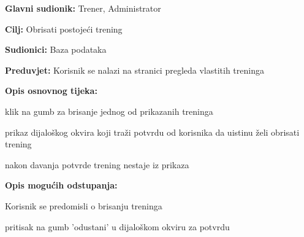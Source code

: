 					\noindent {}
					\begin{packed_item}
	
						\item \textbf{Glavni sudionik: }Trener, Administrator
						\item  \textbf{Cilj: } Obrisati postojeći trening
						\item  \textbf{Sudionici: } Baza podataka
						\item  \textbf{Preduvjet: } Korisnik se nalazi na stranici pregleda vlastitih treninga
						\item  \textbf{Opis osnovnog tijeka:}
						
						\item[] \begin{packed_enum}
	
							\item klik na gumb za brisanje jednog od prikazanih treninga
							\item prikaz dijaloškog okvira koji traži potvrdu od korisnika da uistinu želi obrisati trening
							\item nakon davanja potvrde trening nestaje iz prikaza
							
						\end{packed_enum}
						
						\item  \textbf{Opis mogućih odstupanja:}
						
						\item[] \begin{packed_item}
	
							\item[3.a] Korisnik se predomisli o brisanju treninga
							\item[] \begin{packed_enum}
								
								\item pritisak na gumb 'odustani' u dijaloškom okviru za potvrdu
								
							\end{packed_enum}
							
						\end{packed_item}
					\end{packed_item}
					
